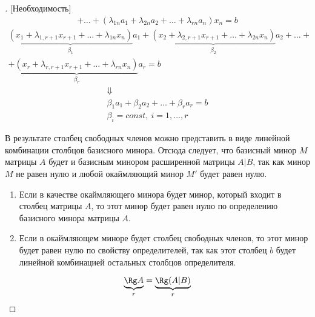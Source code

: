 \begin{proof}[][Необходимость]
\begin{multline*}
+ \ldots + (\lambda_{1n}a_1 + \lambda_{2n}a_2 + \ldots + \lambda_{rn}a_n)x_n = b
\end{multline*} \vspace{-3\topsep}
\begin{multline*}
\underbrace{(x_1 + \lambda_{1,r+1}x_{r+1} + \ldots + \lambda_{1n}x_n)}_{\beta_1}a_1 + \underbrace{(x_2 + \lambda_{2,r+1}x_{r+1} + \ldots + \lambda_{2n}x_n)}_{\beta_2}a_2 + \ldots + \\
+ \underbrace{(x_r + \lambda_{r,r+1}x_{r+1} + \ldots + \lambda_{rn}x_n)}_{\beta_r}a_r = b
\end{multline*} \vspace{-2.5\topsep}
\begin{gather*}
\Downarrow\\
\beta_1a_1 + \beta_2a_2 + \ldots + \beta_ra_r = b\\
\beta_i = const,\ i=1, \ldots, r
\end{gather*} \par
В результате столбец свободных членов можно представить в виде линейной комбинации столбцов базисного минора. Отсюда следует, что базисный минор $M$ матрицы $A$ будет и базисным минором расширенной матрицы $A|B$, так как минор $M$ не равен нулю и любой окаймляющий минор $M'$ будет равен нулю.
\begin{enumerate}
\item Если в качестве окаймляющего минора будет минор, который входит в столбец матрицы $A$, то этот минор будет равен нулю по определению базисного минора матрицы $A$. 
\item Если в окаймляющем миноре будет столбец свободных членов, то этот минор будет равен нулю по свойству определителей, так как этот столбец $b$ будет линейной комбинацией остальных столбцов определителя.
\end{enumerate}
\[ \underbrace{\Rg A}_{r} = \underbrace{\Rg (A|B)}_{r} \]
\end{proof}
